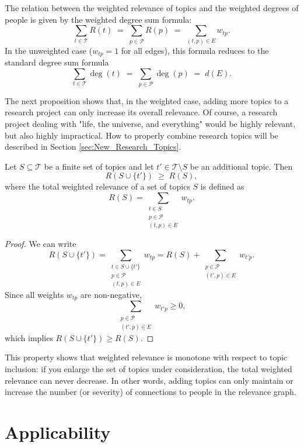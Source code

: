 The relation between the weighted relevance of topics and the weighted degrees of people is given by the weighted degree sum formula:
\[
\sum_{t \in \mathcal{T}} R(t) \;=\; \sum_{p \in \mathcal{P}} R(p) \;=\; \sum_{(t,p) \in E} w_{tp}.
\]
In the unweighted case ($w_{tp} = 1$ for all edges), this formula reduces to the standard degree sum formula
\[
\sum_{t \in \mathcal{T}} \deg(t) \;=\; \sum_{p \in \mathcal{P}} \deg(p) \;=\; d(E).
\]

The next proposition shows that, in the weighted case, adding more topics to a research project can only increase its overall relevance. Of course, a research project dealing with "life, the universe, and everything" would be highly relevant, but also highly impractical. How to properly combine research topics will be described in Section \ref{sec:New_Research_Topics}.

\begin{proposition}
Let $S \subseteq \mathcal{T}$ be a finite set of topics and let $t' \in \mathcal{T} \setminus S$ be an additional topic. Then
\[
R(S \cup \{t'\}) \;\geq\; R(S),
\]
where the total weighted relevance of a set of topics $S$ is defined as
\[
R(S) = \sum_{\substack{t \in S \\ p \in \mathcal{P} \\ (t,p) \in E}} w_{tp}.
\]
\end{proposition}
\begin{proof}
We can write
\[
R(S \cup \{t'\}) = \sum_{\substack{t \in S \cup \{t'\} \\ p \in \mathcal{P} \\ (t,p) \in E}} w_{tp}
= R(S) + \sum_{\substack{p \in \mathcal{P} \\ (t',p) \in E}} w_{t'p}.
\]
Since all weights $w_{tp}$ are non-negative,
\[
\sum_{\substack{p \in \mathcal{P} \\ (t',p) \in E}} w_{t'p} \geq 0,
\]
which implies $R(S \cup \{t'\}) \geq R(S)$.
\end{proof}

This property shows that weighted relevance is monotone with respect to topic inclusion: if you enlarge the set of topics under consideration, the total weighted relevance can never decrease. In other words, adding topics can only maintain or increase the number (or severity) of connections to people in the relevance graph.

%
%

\section{Applicability}
\label{sec:applicability}

